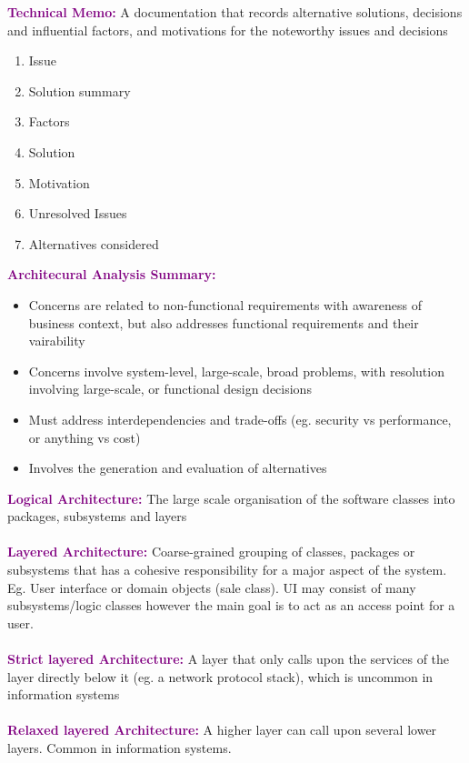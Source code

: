 \documentclass[a4paper,10pt]{article}
\begin{document}
\textcolor{Purple}{\textbf{Technical Memo:}} A documentation that records alternative solutions, decisions and influential factors, and motivations for the noteworthy issues and decisions
\begin{enumerate}
\item Issue 
\item Solution summary 
\item Factors 
\item Solution 
\item Motivation 
\item Unresolved Issues 
\item Alternatives considered 
\end{enumerate}
\newpage
\noindent \textcolor{Purple}{\textbf{Architecural Analysis Summary:}}
\renewcommand{\labelitemi}{\textperiodcentered}
\begin{itemize}
\item Concerns are related to non-functional requirements with awareness of business context, but also addresses functional requirements and their vairability 
\item Concerns involve system-level, large-scale, broad problems, with resolution involving large-scale, or functional design decisions
\item Must address interdependencies and trade-offs (eg. security vs performance, or anything vs cost)
\item Involves the generation and evaluation of alternatives 
\end{itemize}
\textcolor{Purple}{\textbf{Logical Architecture:}} The large scale organisation of the software classes into packages, subsystems and layers\\\\
\textcolor{Purple}{\textbf{Layered Architecture:}} Coarse-grained grouping of classes, packages or subsystems that has a cohesive responsibility for a major aspect of the system. Eg. User interface or domain objects (sale class). UI may consist of many subsystems/logic classes however the main goal is to act as an access point for a user. \\\\
\textcolor{Purple}{\textbf{Strict layered Architecture:}} A layer that only calls upon the services of the layer directly below it (eg. a network protocol stack), which is uncommon in information systems\\\\
\textcolor{Purple}{\textbf{Relaxed layered Architecture:}} A higher layer can call upon several lower layers. Common in information systems.\\\\
\end{document}
